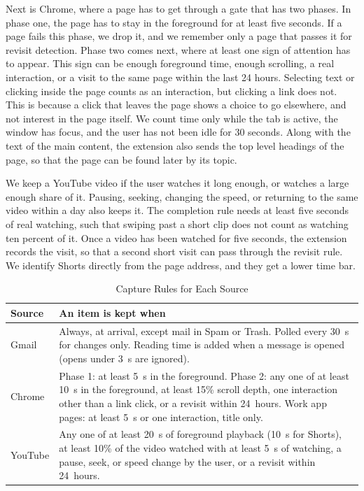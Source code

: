 \documentclass[conference]{IEEEtran}
\begin{document}
Next is Chrome, where a page has to get through a gate that has two phases. In phase one, the page has to stay in the foreground for at least five seconds. If a page fails this phase, we drop it, and we remember only a page that passes it for revisit detection. Phase two comes next, where at least one sign of attention has to appear. This sign can be enough foreground time, enough scrolling, a real interaction, or a visit to the same page within the last 24 hours. Selecting text or clicking inside the page counts as an interaction, but clicking a link does not. This is because a click that leaves the page shows a choice to go elsewhere, and not interest in the page itself. We count time only while the tab is active, the window has focus, and the user has not been idle for 30 seconds. Along with the text of the main content, the extension also sends the top level headings of the page, so that the page can be found later by its topic.

We keep a YouTube video if the user watches it long enough, or watches a large enough share of it. Pausing, seeking, changing the speed, or returning to the same video within a day also keeps it. The completion rule needs at least five seconds of real watching, such that swiping past a short clip does not count as watching ten percent of it. Once a video has been watched for five seconds, the extension records the visit, so that a second short visit can pass through the revisit rule. We identify Shorts directly from the page address, and they get a lower time bar.

\begin{table}[t]
\caption{Capture Rules for Each Source}
\label{tab:gates}
\centering
\renewcommand{\arraystretch}{1.05}
\begin{tabular}{|>{\raggedright\arraybackslash}p{1.35cm}|>{\raggedright\arraybackslash}p{6.2cm}|}
\hline
\textbf{Source} & \textbf{An item is kept when} \\
\hline
Gmail & Always, at arrival, except mail in Spam or Trash. Polled every 30~s for changes only. Reading time is added when a message is opened (opens under 3~s are ignored). \\
\hline
Chrome & Phase 1: at least 5~s in the foreground. Phase 2: any one of at least 10~s in the foreground, at least 15\% scroll depth, one interaction other than a link click, or a revisit within 24~hours. Work app pages: at least 5~s or one interaction, title only. \\
\hline
YouTube & Any one of at least 20~s of foreground playback (10~s for Shorts), at least 10\% of the video watched with at least 5~s of watching, a pause, seek, or speed change by the user, or a revisit within 24~hours. \\
\hline
\end{tabular}
\end{table}
\end{document}
